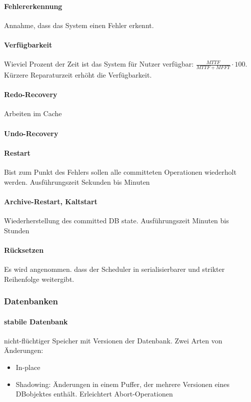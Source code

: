 \documentclass[ngerman]{scrartcl}
\begin{document}
\paragraph{Fehlererkennung} Annahme, dass das System einen Fehler erkennt. 

\paragraph{Verfügbarkeit} Wieviel Prozent der Zeit ist das System für Nutzer verfügbar: $ \frac{MTTF}{MTTF + MFFT} \cdot 100 $. Kürzere Reparaturzeit erhöht die Verfügbarkeit.

\paragraph{Redo-Recovery} Arbeiten im Cache

\paragraph{Undo-Recovery}

\paragraph{Restart} Bist zum Punkt des Fehlers sollen alle committeten Operationen wiederholt werden. Ausführungszeit Sekunden bis Minuten

\paragraph{Archive-Restart, Kaltstart} Wiederherstellung des committed DB state. Ausführungszeit Minuten bis Stunden

\paragraph{Rücksetzen} Es wird angenommen. dass der Scheduler in serialisierbarer und strikter Reihenfolge weitergibt.

\subsubsection{Datenbanken}

\paragraph{stabile Datenbank} 
nicht-flüchtiger Speicher mit Versionen der Datenbank. Zwei Arten von Änderungen:
\begin{itemize}
  \item In-place
  \item Shadowing: Änderungen in einem Puffer, der mehrere Versionen eines DBobjektes enthält. Erleichtert Abort-Operationen
\end{itemize}
\end{document}
